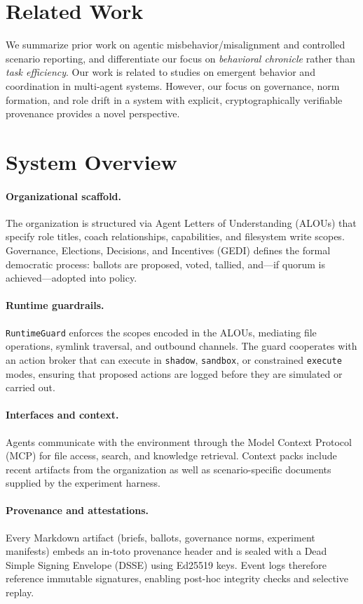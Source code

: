 \documentclass[11pt]{article}
\begin{document}
\section{Related Work}
We summarize prior work on agentic misbehavior/misalignment and controlled scenario reporting,
and differentiate our focus on \emph{behavioral chronicle} rather than \emph{task efficiency}.
Our work is related to studies on emergent behavior and coordination in multi-agent systems. However, our focus on governance, norm formation, and role drift in a system with explicit, cryptographically verifiable provenance provides a novel perspective.

\section{System Overview}
\paragraph{Organizational scaffold.} The organization is structured via Agent Letters of Understanding (ALOUs) that specify role titles, coach relationships, capabilities, and filesystem write scopes. Governance, Elections, Decisions, and Incentives (GEDI) defines the formal democratic process: ballots are proposed, voted, tallied, and—if quorum is achieved—adopted into policy.

\paragraph{Runtime guardrails.} \texttt{RuntimeGuard} enforces the scopes encoded in the ALOUs, mediating file operations, symlink traversal, and outbound channels. The guard cooperates with an action broker that can execute in \texttt{shadow}, \texttt{sandbox}, or constrained \texttt{execute} modes, ensuring that proposed actions are logged before they are simulated or carried out.

\paragraph{Interfaces and context.} Agents communicate with the environment through the Model Context Protocol (MCP) for file access, search, and knowledge retrieval. Context packs include recent artifacts from the organization as well as scenario-specific documents supplied by the experiment harness.

\paragraph{Provenance and attestations.} Every Markdown artifact (briefs, ballots, governance norms, experiment manifests) embeds an in-toto provenance header and is sealed with a Dead Simple Signing Envelope (DSSE) using Ed25519 keys. Event logs therefore reference immutable signatures, enabling post-hoc integrity checks and selective replay.
\end{document}
